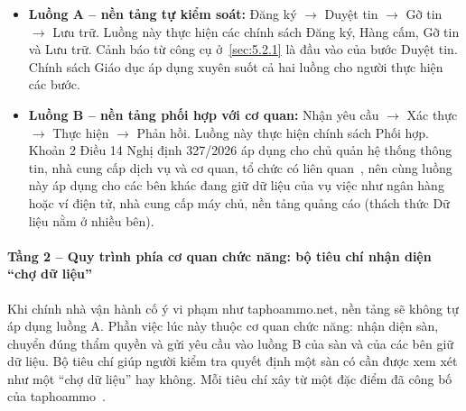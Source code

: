 \begin{itemize}
\item \textbf{Luồng A -- nền tảng tự kiểm soát:} Đăng ký $\rightarrow$ Duyệt tin $\rightarrow$ Gỡ tin $\rightarrow$ Lưu trữ. Luồng này thực hiện các chính sách Đăng ký, Hàng cấm, Gỡ tin và Lưu trữ. Cảnh báo từ công cụ ở~\ref{sec:5.2.1} là đầu vào của bước Duyệt tin. Chính sách Giáo dục áp dụng xuyên suốt cả hai luồng cho người thực hiện các bước.
\item \textbf{Luồng B -- nền tảng phối hợp với cơ quan:} Nhận yêu cầu $\rightarrow$ Xác thực $\rightarrow$ Thực hiện $\rightarrow$ Phản hồi. Luồng này thực hiện chính sách Phối hợp. Khoản 2 Điều 14 Nghị định 327/2026 áp dụng cho chủ quản hệ thống thông tin, nhà cung cấp dịch vụ và cơ quan, tổ chức có liên quan~\cite{nd327-2026}, nên cùng luồng này áp dụng cho các bên khác đang giữ dữ liệu của vụ việc như ngân hàng hoặc ví điện tử, nhà cung cấp máy chủ, nền tảng quảng cáo (thách thức Dữ liệu nằm ở nhiều bên).
\end{itemize}

\paragraph{Tầng 2 -- Quy trình phía cơ quan chức năng: bộ tiêu chí nhận diện “chợ dữ liệu”}

Khi chính nhà vận hành cố ý vi phạm như taphoammo.net, nền tảng sẽ không tự áp dụng luồng A. Phần việc lúc này thuộc cơ quan chức năng: nhận diện sàn, chuyển đúng thẩm quyền và gửi yêu cầu vào luồng B của sàn và của các bên giữ dữ liệu. Bộ tiêu chí giúp người kiểm tra quyết định một sàn có cần được xem xét như một “chợ dữ liệu” hay không. Mỗi tiêu chí xây từ một đặc điểm đã công bố của taphoammo~\cite{bca-2026}.

